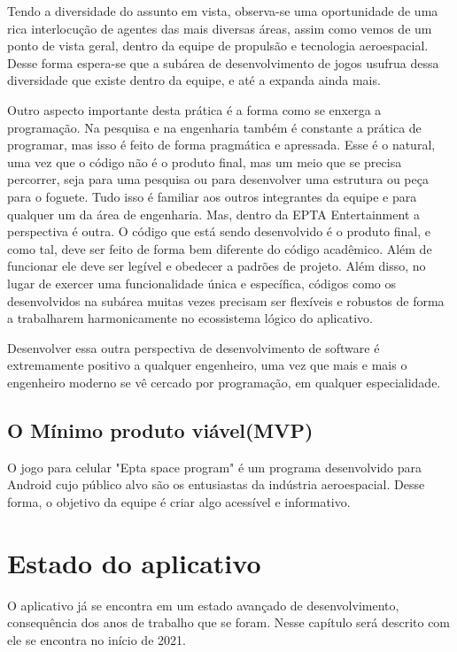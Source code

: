         Tendo a diversidade do assunto em vista, observa-se uma oportunidade de uma rica interlocução de agentes das mais diversas áreas, assim como vemos de um ponto de vista geral, dentro da equipe de propulsão e tecnologia aeroespacial. 
        Desse forma espera-se que a subárea de desenvolvimento de jogos usufrua dessa diversidade que existe dentro da equipe, e até a expanda ainda mais.

        Outro aspecto importante desta prática é a forma como se enxerga a programação. 
        Na pesquisa e na engenharia também é constante a prática de programar, mas isso é feito de forma pragmática e apressada.
        Esse é o natural, uma vez que o código não é o produto final, mas um meio que se precisa percorrer, seja para uma pesquisa ou para desenvolver uma estrutura ou peça para o foguete.
        Tudo isso é familiar aos outros integrantes da equipe e para qualquer um da área de engenharia.
        Mas, dentro da EPTA Entertainment a perspectiva é outra.
        O código que está sendo desenvolvido é o produto final, e como tal, deve ser feito de forma bem diferente do código acadêmico. 
        Além de funcionar ele deve ser legível e obedecer a padrões de projeto. 
        Além disso, no lugar de exercer uma funcionalidade única e específica, códigos como os desenvolvidos na subárea muitas vezes precisam ser flexíveis e robustos de forma a trabalharem harmonicamente no ecossistema lógico do aplicativo.
        
        Desenvolver essa outra perspectiva de desenvolvimento de software é extremamente positivo a qualquer engenheiro, uma vez que mais e mais o engenheiro moderno se vê cercado por programação, em qualquer especialidade.

\section{O Mínimo produto viável(MVP)}

    O jogo para celular "Epta space program" é um programa desenvolvido para Android cujo público alvo são os entusiastas da indústria aeroespacial. Desse forma, o objetivo da equipe é criar algo acessível e informativo.

\chapter{Estado do aplicativo}
    
    O aplicativo já se encontra em um estado avançado de desenvolvimento, consequência dos anos de trabalho que se foram.
    Nesse capítulo será descrito com ele se encontra no início de 2021. 
    
